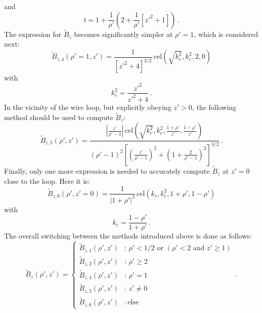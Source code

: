 and
\begin{equation}
  t = 1 + \frac{1}{\rho'} \left( 2 + \frac{1}{\rho'} \left[ {z'}^2 + 1 \right] \right) \, .
\end{equation}
The expression for $\tilde{B}_z$ becomes significantly simpler at $\rho'=1$,
which is considered next:
\begin{equation}
  \tilde{B}_{z,4} (\rho'=1, z')
  = \frac{1}{\left[ {z'}^2 + 4 \right]^{3/2}} \,\mathrm{cel}(\sqrt{k_c^2}, k_c^2, 2, 0)
\end{equation}
with
\begin{equation}
  k_c^2 = \frac{{z'}^2}{{z'}^2 + 4} \, .
\end{equation}
In the vicinity of the wire loop, but explicitly obeying $z' > 0$,
the following method should be used to compute $\tilde{B}_z$:
\begin{equation}
  \tilde{B}_{z,5} (\rho', z')
  = \frac{\left| \frac{z'}{\rho' - 1} \right| \,\mathrm{cel}\left( \sqrt{k_c^2}, k_c^2, \frac{1 + \rho'}{z'}, \frac{1 - \rho'}{z'} \right) }
         {\left(\rho' - 1 \right)^2 \left[ \left( \frac{z'}{\rho'-1} \right)^2 + \left(1 + \frac{2}{\rho'-1} \right)^2 \right]^{3/2} } \, .
\end{equation}
Finally, only one more expression is needed to accurately compute $\tilde{B}_z$ at $z'=0$ close to the loop.
Here it is:
\begin{equation}
  \tilde{B}_{z,6} (\rho', z'=0)
  = \frac{1}{|1 + \rho'|^3}
    \,\mathrm{cel}(k_c, k_c^2, 1+\rho', 1-\rho')
\end{equation}
with
\begin{equation}
  k_c = \frac{1-\rho'}{1+\rho'} \, .
\end{equation}
%
%
The overall switching between the methods introduced above is done as follows:
\begin{equation}
  \tilde{B}_z(\rho', z')
  = \begin{cases}
      \tilde{B}_{z,1} (\rho', z') &:\, \rho' < 1/2 \textrm{ or } (\rho' < 2 \textrm{ and } z' \geq 1) \\
      \tilde{B}_{z,2} (\rho', z') &:\, \rho' \geq 2 \\
      \tilde{B}_{z,4} (\rho', z') &:\, \rho' = 1 \\
      \tilde{B}_{z,5} (\rho', z') &:\, z' \neq 0 \\
      \tilde{B}_{z,6} (\rho', z') &:\, \textrm{else}
    \end{cases} \, .
\end{equation}





